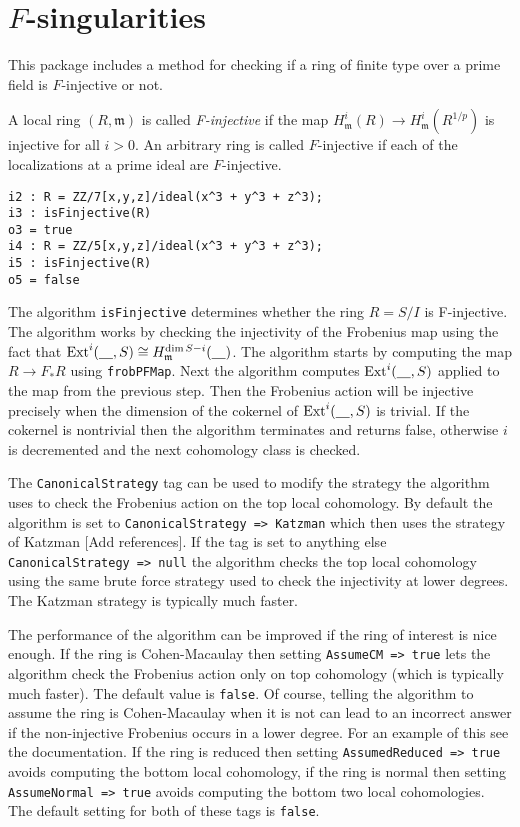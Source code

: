 \documentclass[11pt]{amsart}
\begin{document}
\section{$F$-singularities}



This package includes a method for checking if a ring of finite type over a
prime field is $F$-injective or not.

\begin{definition}
A local ring $(R, \mathfrak{m})$ is called \emph{F-injective} if the map
$H^{i}_{\mathfrak{m}}(R) \rightarrow H^{i}_{\mathfrak{m}}(R^{1/p})$ is
injective for all $i >0$. An arbitrary ring is called $F$-injective if each
of the localizations at a prime ideal are $F$-injective.
\end{definition}


\begin{verbatim}
i2 : R = ZZ/7[x,y,z]/ideal(x^3 + y^3 + z^3);
i3 : isFinjective(R)
o3 = true
i4 : R = ZZ/5[x,y,z]/ideal(x^3 + y^3 + z^3);
i5 : isFinjective(R)
o5 = false
\end{verbatim}


The algorithm {\tt isFinjective} determines whether the ring $R = S/I$ is
F-injective. The algorithm works by checking the injectivity of the
Frobenius map using the fact that $\operatorname{Ext}^{i}(\underline{\hskip 10pt}, S) \cong H^{\dim S -
i}_{\mathfrak{m}}(\underline{\hskip 10pt}) $. The algorithm starts by computing the map $R
\rightarrow F_{*}R$ using {\tt frobPFMap}. Next the algorithm computes
$\operatorname{Ext}^{i}( \underline{\hskip 10pt}, S)$ applied to the map from the previous step. Then the
Frobenius action will be injective precisely when the dimension of the
cokernel of $\operatorname{Ext}^{i}( \underline{\hskip 10pt}, S)$ is trivial. If the cokernel is
nontrivial then the algorithm terminates and returns false, otherwise $i$
is decremented and the next cohomology class is checked.


The {\tt CanonicalStrategy} tag can be used to modify the strategy the
algorithm uses to check the Frobenius action on the top local cohomology.
By default the algorithm is set to {\tt CanonicalStrategy => Katzman} which
then uses the strategy of Katzman {\hfill\large\color{red} [Add
references]}. If the tag is set to anything else {\tt CanonicalStrategy =>
null} the algorithm checks the top local cohomology using the same brute
force strategy used to check the injectivity at lower degrees. The Katzman
strategy is typically much faster.


The performance of the algorithm can be improved if the ring of interest is
nice enough. If the ring is Cohen-Macaulay then setting {\tt AssumeCM =>
true} lets the algorithm check the Frobenius action only on top cohomology
(which is typically much faster). The default value is {\tt false}. Of
course, telling the algorithm to assume the ring is Cohen-Macaulay when it
is not can lead to an incorrect answer if the non-injective Frobenius
occurs in a lower degree. For an example of this see the documentation. If
the ring is reduced then setting {\tt AssumedReduced => true} avoids
computing the bottom local cohomology, if the ring is normal then setting
{\tt AssumeNormal => true} avoids computing the bottom two local
cohomologies. The default setting for both of these tags is {\tt false}.
\end{document}
